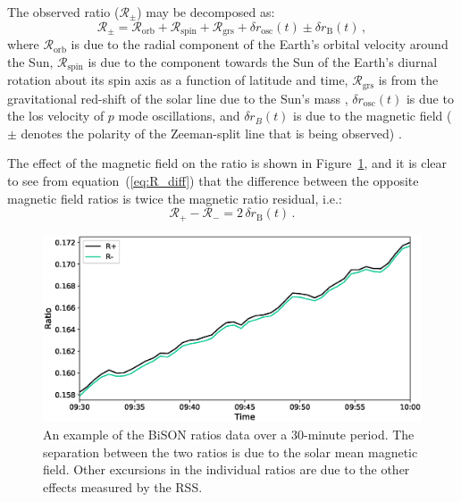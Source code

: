 The observed ratio ($\mathcal{R}_{\pm}$) may be decomposed as:
%
\begin{equation}
\mathcal{R}_{\pm} = \mathcal{R}_{\mathrm{orb}} + \mathcal{R}_{\mathrm{spin}} + \mathcal{R}_{\mathrm{grs}} + \delta {r}_{\mathrm{osc}}(t) \pm \delta {r}_{\mathrm{B}}(t) \, ,
\label{eq:vel_comp}
\end{equation}
%
where $\mathcal{R}_{\mathrm{orb}}$ is due to the radial component of the Earth's orbital velocity around the Sun, $\mathcal{R}_{\mathrm{spin}}$ is due to the component towards the Sun of the Earth's diurnal rotation about its spin axis as a function of latitude and time, $\mathcal{R}_{\mathrm{grs}}$ is from the gravitational red-shift of the solar line due to the Sun's mass \citep{elsworth_techniques_1995, dumbill_observation_1999}, $\delta {r}_{\mathrm{osc}}(t)$ is due to the \gls{los} velocity of $p$ mode oscillations, and $\delta {r}_B(t)$ is due to the magnetic field ($\pm$ denotes the polarity of the Zeeman-split line that is being observed) \citep{dumbill_observation_1999}. 



The effect of the magnetic field on the ratio is shown in Figure~\ref{fig:ratio_split}, and it is clear to see from equation~(\ref{eq:R_diff}) that the difference between the opposite magnetic field ratios is twice the magnetic ratio residual, i.e.:
%
\begin{equation}
\mathcal{R}_{+} - \mathcal{R}_{-} = 2 \, \delta {r}_{\mathrm{B}}(t) \, .
\label{eq:R_diff}
\end{equation}

\begin{figure}[ht!]
	\includegraphics[width=\columnwidth]{Fred_ratio_zoom.eps}
	\caption{An example of the BiSON ratios data over a 30-minute period. The separation between the two ratios is due to the solar mean magnetic field. Other excursions in the individual ratios are due to the other effects measured by the RSS.}
	\label{fig:ratio_split}
\end{figure}

